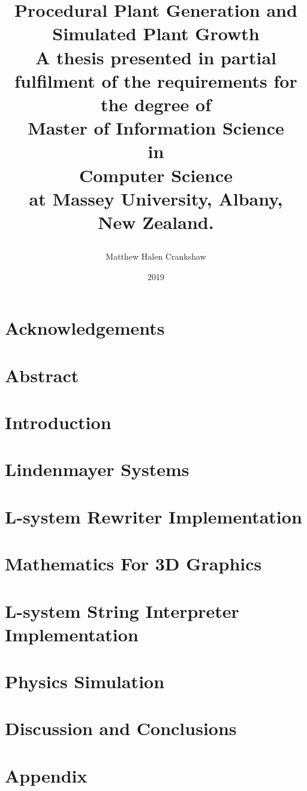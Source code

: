 \documentclass[11pt, twoside]{report}
\title{
{\huge \textbf{Procedural Plant Generation and Simulated Plant Growth }}\\
\vspace{3cm}
{\large A thesis presented in partial fulfilment of the requirements for the degree of \\
\vspace{4cm}
\large \textbf{Master of Information Science}\\
\large \textbf{in}\\
\large \textbf{Computer Science}\\
\vspace{4cm}
\large at Massey University, Albany, \\
\large New Zealand. }
\vspace{3cm}
\author{Matthew Halen Crankshaw}
\date{2019}
}
\begin{document}
\maketitle

\chapter*{Acknowledgements}


\chapter*{Abstract}


\tableofcontents
\listoffigures
\listoftables


\chapter{Introduction}


\chapter{Lindenmayer Systems}  \label{l-system chapter} 


\chapter{L-system Rewriter Implementation}


\chapter{Mathematics For 3D Graphics} \label{maths chapter}


\chapter{L-system String Interpreter Implementation} \label{interpreter implementation}


\chapter{Physics Simulation} \label{physics chapter}


\chapter{Discussion and Conclusions}


\printglossary[type=\acronymtype]
\printglossary

\appendix
\chapter{Appendix}

\end{document}
